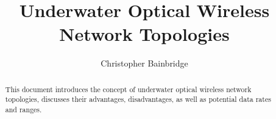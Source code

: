 \documentclass{article}
\author{Christopher Bainbridge}
\title{Underwater Optical Wireless Network Topologies}
\begin{document}
\maketitle

\begin{abstract}
This document introduces the concept of underwater optical wireless
network topologies, discusses their advantages, disadvantages, as well
as potential data rates and ranges.
\end{abstract}
















\end{document}
